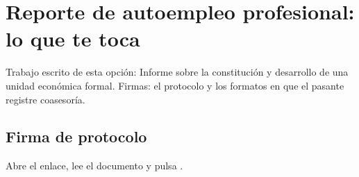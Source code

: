 \section{Reporte de autoempleo profesional: lo que te toca}
Trabajo escrito de esta opción: Informe sobre la constitución y desarrollo de una unidad económica formal. Firmas: el protocolo y los formatos en que el pasante registre coasesoría.
\subsection{Firma de protocolo}
Abre el enlace, lee el documento y pulsa .
